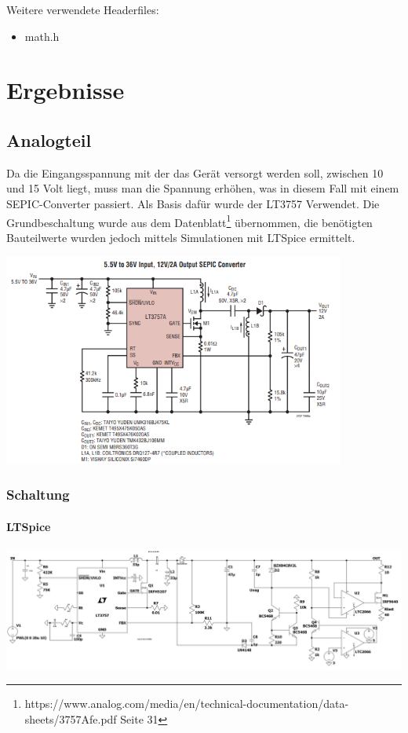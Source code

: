\documentclass[paper=a4, 12pt]{scrreprt}
\begin{document}
	Weitere verwendete Headerfiles:
	\begin{itemize}
		\item math.h
	\end{itemize}
	
	
\chapter{Ergebnisse}
	\section{Analogteil}
	Da die Eingangsspannung mit der das Gerät versorgt werden soll, zwischen 10 und 15 Volt liegt, muss man die Spannung erhöhen, was in diesem Fall mit einem SEPIC-Converter passiert. Als Basis dafür wurde der LT3757 Verwendet.\hfill \break
	Die Grundbeschaltung wurde aus dem Datenblatt\footnote{https://www.analog.com/media/en/technical-documentation/data-sheets/3757Afe.pdf Seite 31} übernommen, die benötigten Bauteilwerte wurden jedoch mittels Simulationen mit LTSpice ermittelt. 
	\begin{adjustbox}{center,caption={Referenzschaltung für SEPIC}, label={fig:LTSpice-Schaltung-Analogteil},nofloat=figure,vspace=\bigskipamount}
		\includegraphics[height=7cm]{img/Referenzschaltung_SEPIC.PNG}
	\end{adjustbox}
	
		\subsection{Schaltung}
			\subsubsection{LTSpice}
			\begin{adjustbox}{center,caption={Simulationsschaltung des Analogteils in LTSpice},label={fig:LTSpice-Schaltung-Analogteil},nofloat=figure,vspace=\bigskipamount}
				\includegraphics[width=\textwidth]{img/LTSpice_Schaltung_Analogteil.PNG}
			\end{adjustbox}
			\pagebreak
\end{document}
